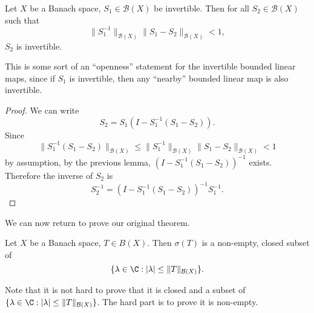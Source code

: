 \documentclass[a4paper]{article}
\begin{document}
\begin{lemma}
  Let $X$ be a Banach space, $S_1 \in \mathcal{B}(X)$ be invertible. Then for all $S_2 \in \mathcal{B}(X)$ such that
  \[
    \|S_1^{-1}\|_{\mathcal{B}(X)} \|S_1 - S_2\|_{\mathcal{B}(X)} < 1,
  \]
  $S_2$ is invertible.
\end{lemma}
This is some sort of an ``openness'' statement for the invertible bounded linear maps, since if $S_1$ is invertible, then any ``nearby'' bounded linear map is also invertible.
\begin{proof}
  We can write
  \[
    S_2 = S_1(I - S_1^{-1}(S_1 - S_2)).
  \]
  Since
  \[
    \|S_1^{-1}(S_1 - S_2)\|_{\mathcal{B}(X)} \leq \|S_1^{-1} \|_{\mathcal{B}(X)} \|S_1 - S_2\|_{\mathcal{B}(X)} < 1
  \]
  by assumption, by the previous lemma, $(I - S_1^{-1}(S_1 - S_2))^{-1}$ exists. Therefore the inverse of $S_2$ is
  \[
    S_2^{-1} = (I - S_1^{-1}(S_1 - S_2))^{-1} S_1^{-1}.
  \]
\end{proof}

We can now return to prove our original theorem.
\begin{thm}
  Let $X$ be a Banach space, $T \in B(X)$. Then $\sigma(T)$ is a non-empty, closed subset of
  \[
    \{\lambda \in \C: |\lambda| \leq \|T\|_{\mathcal{B}(X)}\}.
  \]
\end{thm}
Note that it is not hard to prove that it is closed and a subset of $\{\lambda \in \C: |\lambda| \leq \|T\|_{\mathcal{B}(X)}\}$. The hard part is to prove it is non-empty.
\end{document}
